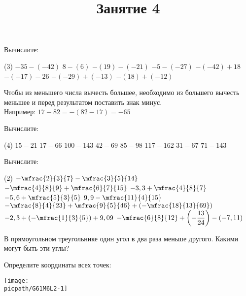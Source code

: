 \begin{class}[number=3-4]
\begin{listofex}[resume]
		\item Вычислите:
		\begin{tasks}(3)
			\task \( -35 - (-42) \)
			\task \( 8-(6) \)
			\task \( -(19)-(-21) \)
			\task \( -5-(-27) \)
			\task \( -(-42)+18 \)
			\task \( -(-17)-26 \)
			\task \( -(-29)+(-13) \)
			\task \( -(18)+(-12) \)
		\end{tasks}
	\end{listofex}
	\begin{definit}
		Чтобы из меньшего числа вычесть большее, необходимо из большего вычесть меньшее и перед результатом поставить знак минус. \\ Например: \( 17-82 = -(82-17)=-65 \)
	\end{definit}
	\begin{listofex}[resume]
		\item Вычислите:
		\begin{tasks}(4)
			\task \( 15-21 \)
			\task \( 17-66 \)
			\task \( 100-143 \)
			\task \( 42-69 \)
			\task \( 85-98 \)
			\task \( 117-162 \)
			\task \( 31-67 \)
			\task \( 71-143 \)
		\end{tasks}
		\item Вычислите:
		\begin{tasks}(2)
			\task \( -\mfrac{2}{3}{7}-\mfrac{3}{5}{14} \)
			\task \( -\mfrac{4}{8}{9}+\mfrac{6}{7}{15} \)
			\task \( -3,3+\mfrac{4}{8}{7} \)
			\task \( -5,6+\mfrac{5}{3}{5} \)
			\task \( 9,9-\mfrac{11}{4}{15} \)
			\task \( -\mfrac{8}{4}{23}+\mfrac{9}{5}{46}+\left(-\mfrac{18}{13}{69}\right) \)
			\task \( -2,3 + \left(-\mfrac{1}{3}{5}\right) + 9,09 \)
			\task \( -\mfrac{6}{8}{12} + \left(-\dfrac{13}{24}\right) - (-7,11) \)
		\end{tasks}
		\item В прямоугольном треугольнике один угол в два раза меньше другого. Какими могут быть эти углы?
	\end{listofex}
	\title{Занятие 4}
	\begin{listofex}
		\item
		\begin{minipage}[t]{\bodywidth}
			Определите координаты всех точек:
		\end{minipage}
		\begin{minipage}[c]{0.7\linewidth}
			\texttt{[image: \\picpath/G61M6L2-1]}
		\end{minipage}
	\end{listofex}
	\begin{definit}

\end{definit}
\end{class}
